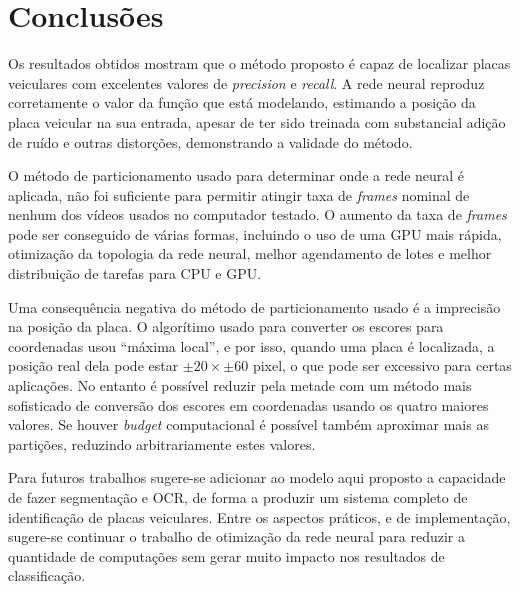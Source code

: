 
\chapter{Conclusões}

Os resultados obtidos mostram que o método proposto é capaz de localizar placas
veiculares com excelentes valores de \emph{precision} e \emph{recall}.  
A rede neural reproduz corretamente o valor da função
que está modelando, estimando a posição da placa veicular na sua
entrada, apesar de ter sido treinada com substancial adição de ruído e outras
distorções, demonstrando a validade do método.

O método de particionamento usado para determinar onde a rede neural é
aplicada, não foi suficiente para permitir atingir taxa de \emph{frames}
nominal de nenhum dos vídeos usados no computador testado. O aumento da
taxa de \emph{frames}
pode ser conseguido de várias formas, incluindo o uso de uma GPU mais rápida,
otimização da topologia da rede neural, melhor agendamento de lotes e melhor
distribuição de tarefas para CPU e GPU.

Uma consequência negativa do método de particionamento usado
é a imprecisão na
posição da placa. O algorítimo usado para converter os escores para coordenadas
usou ``máxima local'', e por isso, quando uma placa é localizada, a posição real
dela pode estar $\pm 20 \times \pm 60$ pixel, o que pode ser excessivo para
certas aplicações. No entanto é possível reduzir pela metade com um método mais
sofisticado de conversão dos escores em coordenadas usando os quatro maiores
valores. Se houver \emph{budget} computacional é possível também
aproximar mais as partições, reduzindo arbitrariamente estes valores.

Para futuros trabalhos sugere-se adicionar ao modelo aqui proposto a
capacidade de fazer segmentação e OCR, de forma a produzir um sistema completo
de identificação de placas veiculares. Entre os aspectos práticos, e de
implementação, sugere-se continuar o trabalho de otimização da rede
neural para reduzir a quantidade de computações sem gerar muito impacto nos
resultados de classificação.
